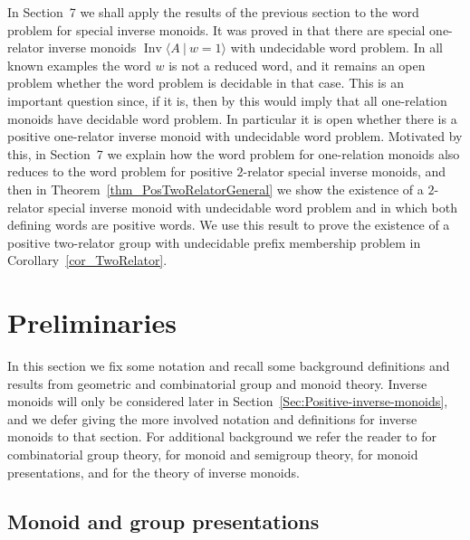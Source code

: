 \documentclass{amsart}
\newcommand{\Ipres}[2]{\operatorname{Inv}\bigl\langle #1\:|\:#2 \bigr\rangle}
\theoremstyle{plain}
\theoremstyle{definition}
\begin{document}
In Section~7 we shall apply the results of the previous section to the word problem for special inverse monoids. It was proved in \cite{gray2020undecidability} that there are special one-relator inverse monoids $\Ipres{A}{w=1}$ with undecidable word problem. In all known examples the word $w$ is not a reduced word, and it remains an open problem whether the word problem is decidable in that case. This is an important question since, if it is, then by \cite[Theorem~2.2]{Ivanov2001} this would imply that all one-relation monoids have decidable word problem. In particular it is open whether there is a positive one-relator inverse monoid with undecidable word problem. Motivated by this, in Section~7 we explain how the word problem for one-relation monoids also reduces to the word problem for positive $2$-relator special inverse monoids, and then in Theorem~\ref{thm_PosTwoRelatorGeneral} we show the existence of a $2$-relator special inverse monoid with undecidable word problem and in which both defining words are positive words. We use this result to prove the existence of a positive two-relator group with undecidable prefix membership problem in Corollary~\ref{cor_TwoRelator}. 






 


\section{Preliminaries}\label{Sec2-Preliminaries}

In this section we fix some notation and recall some background definitions and results from geometric and combinatorial group and monoid theory. Inverse monoids will only be considered later in Section~\ref{Sec:Positive-inverse-monoids}, and we defer giving the more involved notation and definitions for inverse monoids to that section. For additional background we refer the reader to 
\cite{Magnus1966, lyndon1977combinatorial} for combinatorial group theory, \cite{Howie1995} for monoid and semigroup theory, \cite[Chapter~1]{Ruskuc1995} for monoid presentations, and 
\cite{Lawson1998} for the theory of inverse monoids. 

\subsection*{Monoid and group presentations}
\end{document}

